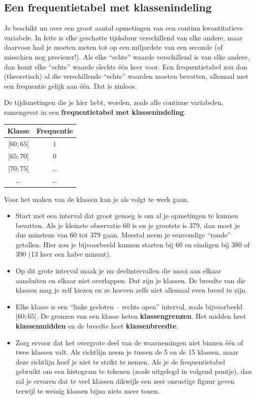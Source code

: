 \documentclass[12pt,twoside,a4paper]{article}
\begin{document}
\subsection{Een frequentietabel met klassenindeling}

Je beschikt nu over een groot aantal opmetingen van een continu kwantitatieve variabele. In feite is elke geschatte tijdsduur verschillend van elke andere, maar daarvoor had je moeten meten tot op een miljardste van een seconde (of misschien nog preciezer!). Als elke “echte” waarde verschillend is van elke andere, dan komt elke “echte” waarde slechts één keer voor. Een frequentietabel zou dan (theoretisch) al die verschillende “echte” waarden moeten bevatten, allemaal met een frequentie gelijk aan één. Dat is zinloos.

De tijdsmetingen die je hier hebt, worden, zoals alle continue variabelen, samengevat in een
{\bf frequentietabel met klassenindeling}.

\begin{center}
  \begin{tabular}{|c|c|}
    \hline
    Klasse & Frequentie\\
    \hline
    $[60;65[$ & $1$\\
    \hline
    $[65;70[$ & $0$\\
    \hline
    $[70;75[$ & \ldots\\
    \hline
    \ldots & \ldots\\
    \hline
  \end{tabular}
\end{center}

Voor het maken van de klassen kan je als volgt te werk gaan.
\begin{itemize}
  \item Start met een interval dat groot genoeg is om al je opmetingen te kunnen bevatten. Als je kleinste observatie 60 is en je grootste is 379, dan moet je dus minstens van 60 tot 379 gaan. Meestal neem je eenvoudige “ronde” getallen. Hier zou je bijvoorbeeld kunnen starten bij 60 en eindigen bij 380 of 390 (13 keer een halve minuut).
  \item Op dit grote interval maak je nu deelintervallen die mooi aan elkaar aansluiten en elkaar niet overlappen. Dat zijn je klassen. De breedte van die klassen mag je zelf kiezen en ze hoeven zelfs niet allemaal even breed te zijn.
  \item Elke klasse is een “links gesloten – rechts open” interval, zoals bijvoorbeeld $[60;65[$. De grenzen van een klasse heten {\bf klassengrenzen}. Het midden heet {\bf klassenmidden} en de breedte heet {\bf klassenbreedte}.
  \item Zorg ervoor dat het overgrote deel van de waarnemingen niet binnen één of twee klassen valt. Als richtlijn neem je tussen de 5 en de 15 klassen, maar deze richtlijn hoef je niet te strikt te nemen. Als je de frequentietabel gebruikt om een histogram te tekenen (zoals uitgelegd in volgend puntje), dan zal je ervaren dat te veel klassen dikwijls een zeer onrustige figuur geven terwijl te weinig klassen bijna niets meer tonen.
\end{itemize}
\end{document}
